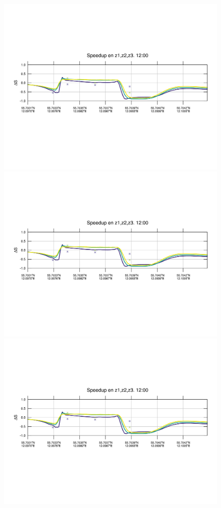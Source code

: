 \begin{figure}[H]
	\centering
	\includegraphics[width=0.95\linewidth,trim={12mm 84mm 10mm 74mm},page=1,clip]{Imagenes/06/bol/speedup}\\%
	\includegraphics[width=0.95\linewidth,trim={12mm 84mm 10mm 74mm},page=13,clip]{Imagenes/06/bol/speedup}\\%
	\includegraphics[width=0.95\linewidth,trim={12mm 84mm 10mm 74mm},page=25,clip]{Imagenes/06/bol/speedup}\\%

\end{figure}
